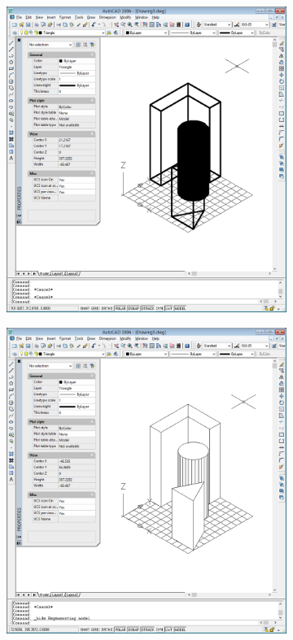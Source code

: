 \documentclass[
	a4paper,
	oneside,
	BCOR = 10mm,
	DIV = 12,
	12pt,
	headings = normal,
]{scrartcl}
\newlength{\gridunitwidth}
\begin{document}
\begin{figure}[!htbp]
\begin{subfigure}[b]{4 \gridunitwidth}
					\caption{}
					\label{subfig:03-figures-3d-tall-polygon}
				\end{subfigure}
				\begin{subfigure}[b]{4 \gridunitwidth}
					\centering
					\includegraphics[width = \columnwidth]{./assets/p09.png}
					\caption{}
					\label{subfig:03-figures-3d-tall-all}
				\end{subfigure}%
				\hspace{2 \gridunitwidth}%
				\begin{subfigure}[b]{4 \gridunitwidth}
					\centering
					\includegraphics[width = \columnwidth]{./assets/p10.png}

\end{subfigure}
\end{figure}
\end{document}
